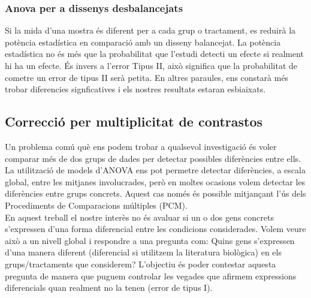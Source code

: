 \documentclass[english]{article}
\begin{document}
\subsubsection{Anova per a dissenys desbalancejats}
Si la mida d'una mostra és diferent per a cada grup o tractament, es reduirà la potència estadística en comparació amb un disseny balancejat. La potència estadística no és més que la probabilitat que l'estudi detecti un efecte si realment hi ha un efecte. És invers a l'error Tipus II, això significa que la probabilitat de cometre un error de tipus II serà petita. En altres paraules, ens constarà més trobar diferencies signficatives i els nostres resultats estaran esbiaixats.
\clearpage
\subsection{Correcció per multiplicitat de contrastos}
Un problema comú què ens podem trobar a qualsevol investigació és voler comparar més de dos grups de dades per detectar possibles diferències entre ells. La utilització de models d'ANOVA ens pot permetre detectar diferències, a escala global, entre les mitjanes involucrades, però en moltes ocasions volem detectar les diferències entre grups concrets. Aquest cas només és possible mitjançant l'ús dels Procediments de Comparacions múltiples (PCM).
\\

En aquest treball el nostre interès no és avaluar si un o dos gens concrets s'expressen d'una forma diferencial entre les condicions considerades. Volem veure això a un nivell global i respondre a una pregunta com: Quins gens s'expressen d'una manera diferent (diferencial si utilitzem la literatura biològica) en els grups/tractaments que considerem? L'objectiu és poder contestar aquesta pregunta de manera que puguem controlar les vegades que afirmem expressions diferencials quan realment no la tenen (error de tipus I).
\\
\end{document}
